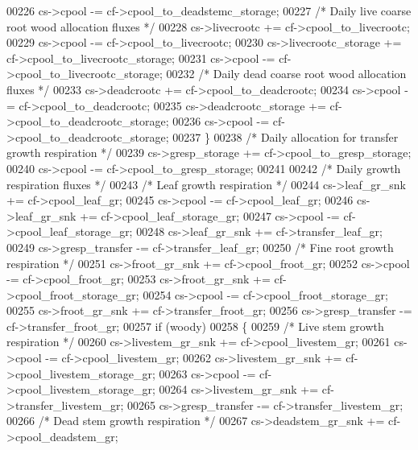 \begin{DoxyCode}
{00226         cs->cpool              -= cf->cpool\_to\_deadstemc\_storage;
00227         \textcolor{comment}{/* Daily live coarse root wood allocation fluxes */}
00228         cs->livecrootc         += cf->cpool\_to\_livecrootc;
00229         cs->cpool              -= cf->cpool\_to\_livecrootc;
00230         cs->livecrootc\_storage += cf->cpool\_to\_livecrootc\_storage;
00231         cs->cpool              -= cf->cpool\_to\_livecrootc\_storage;
00232         \textcolor{comment}{/* Daily dead coarse root wood allocation fluxes */}
00233         cs->deadcrootc         += cf->cpool\_to\_deadcrootc;
00234         cs->cpool              -= cf->cpool\_to\_deadcrootc;
00235         cs->deadcrootc\_storage += cf->cpool\_to\_deadcrootc\_storage;
00236         cs->cpool              -= cf->cpool\_to\_deadcrootc\_storage;
00237     \}
00238     \textcolor{comment}{/* Daily allocation for transfer growth respiration */}
00239     cs->gresp\_storage  += cf->cpool\_to\_gresp\_storage;
00240     cs->cpool          -= cf->cpool\_to\_gresp\_storage;
00241     
00242     \textcolor{comment}{/* Daily growth respiration fluxes */}
00243     \textcolor{comment}{/* Leaf growth respiration */}
00244     cs->leaf\_gr\_snk     += cf->cpool\_leaf\_gr;
00245     cs->cpool           -= cf->cpool\_leaf\_gr;
00246     cs->leaf\_gr\_snk     += cf->cpool\_leaf\_storage\_gr;
00247     cs->cpool           -= cf->cpool\_leaf\_storage\_gr;
00248     cs->leaf\_gr\_snk     += cf->transfer\_leaf\_gr;
00249     cs->gresp\_transfer  -= cf->transfer\_leaf\_gr;
00250     \textcolor{comment}{/* Fine root growth respiration */}
00251     cs->froot\_gr\_snk    += cf->cpool\_froot\_gr;
00252     cs->cpool           -= cf->cpool\_froot\_gr;
00253     cs->froot\_gr\_snk    += cf->cpool\_froot\_storage\_gr;
00254     cs->cpool           -= cf->cpool\_froot\_storage\_gr;
00255     cs->froot\_gr\_snk    += cf->transfer\_froot\_gr;
00256     cs->gresp\_transfer  -= cf->transfer\_froot\_gr;
00257     \textcolor{keywordflow}{if} (woody)
00258     \{
00259         \textcolor{comment}{/* Live stem growth respiration */} 
00260         cs->livestem\_gr\_snk  += cf->cpool\_livestem\_gr;
00261         cs->cpool            -= cf->cpool\_livestem\_gr;
00262         cs->livestem\_gr\_snk  += cf->cpool\_livestem\_storage\_gr;
00263         cs->cpool            -= cf->cpool\_livestem\_storage\_gr;
00264         cs->livestem\_gr\_snk  += cf->transfer\_livestem\_gr;
00265         cs->gresp\_transfer   -= cf->transfer\_livestem\_gr;
00266         \textcolor{comment}{/* Dead stem growth respiration */} 
00267         cs->deadstem\_gr\_snk  += cf->cpool\_deadstem\_gr;
}
\end{DoxyCode}
